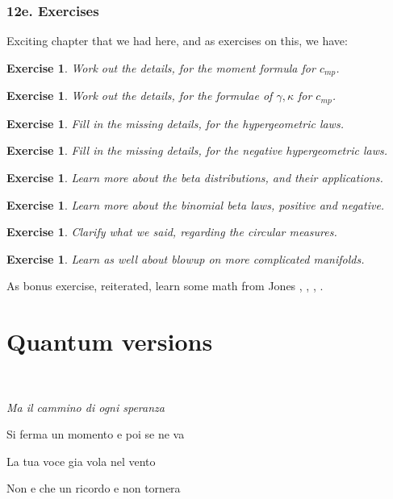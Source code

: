 \documentclass[12pt]{amsbook}
\newtheorem{exercise}[theorem]{Exercise}
\begin{document}
\section*{12e. Exercises}

Exciting chapter that we had here, and as exercises on this, we have:

\begin{exercise}
Work out the details, for the moment formula for $c_{mp}$.
\end{exercise}

\begin{exercise}
Work out the details, for the formulae of $\gamma,\kappa$ for $c_{mp}$.
\end{exercise}

\begin{exercise}
Fill in the missing details, for the hypergeometric laws.
\end{exercise}

\begin{exercise}
Fill in the missing details, for the negative hypergeometric laws.
\end{exercise}

\begin{exercise}
Learn more about the beta distributions, and their applications.
\end{exercise}

\begin{exercise}
Learn more about the binomial beta laws, positive and negative.
\end{exercise}

\begin{exercise}
Clarify what we said, regarding the circular measures.
\end{exercise}

\begin{exercise}
Learn as well about blowup on more complicated manifolds.
\end{exercise}

As bonus exercise, reiterated, learn some math from Jones \cite{jo1}, \cite{jo2}, \cite{jo3}, \cite{jo4}.

\part{Quantum versions}

\ \vskip50mm

\begin{center}
{\em Ma il cammino di ogni speranza

Si ferma un momento e poi se ne va

La tua voce gia vola nel vento

Non e che un ricordo e non tornera}
\end{center}
\end{document}
